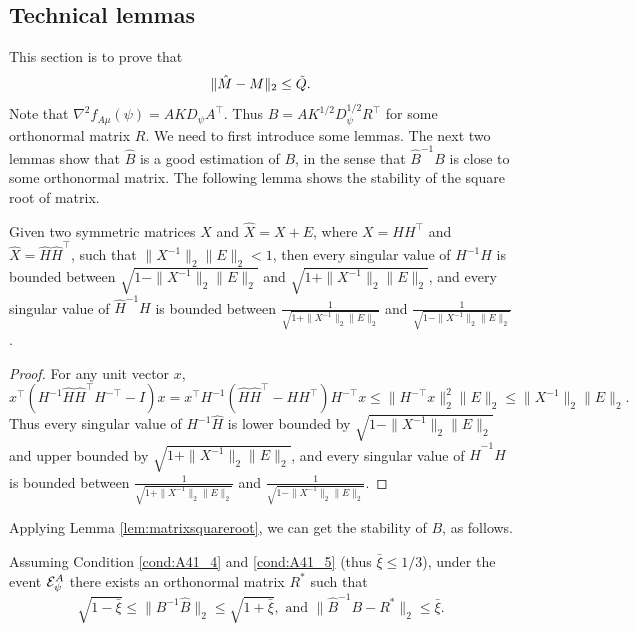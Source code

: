 \subsection{Technical lemmas}
This section is to prove that 
\[
\|\hat{M} - M\|_2 \le \tilde{Q}.
\]
Note that $\nabla^2f_{A\mu}(\psi) = AKD_{\psi}A^{\top}$. Thus $B = AK^{1/2}D_{\psi}^{1/2}R^{\top}$ for some orthonormal matrix $R$. 
We need to first introduce some lemmas. 
The next two lemmas show that $\hat{B}$ is a good estimation of $B$, 
in the sense that $\hat{B}^{-1}B$ is close to some orthonormal matrix.
The following lemma shows the stability of the square root of matrix.
\begin{lemma}
	\label{lem:matrixsquareroot}
	Given two symmetric matrices $X$ and $\hat{X} = X + E$, where $X = HH^{\top}$ and $\hat{X} = \hat{H}\hat{H}^{\top}$, such that $\|X^{-1}\|_2 \|E\|_2 < 1$, then every singular value of $H^{-1}\hat{H}$ is bounded between $\sqrt{1- \|X^{-1}\|_2 \|E\|_2}$ and $\sqrt{1+ \|X^{-1}\|_2 \|E\|_2}$, 
	and every singular value of $\hat{H}^{-1}H$ is bounded between $\frac{1}{\sqrt{1 + \|X^{-1}\|_2 \|E\|_2}}$ and $\frac{1}{\sqrt{1 - \|X^{-1}\|_2 \|E\|_2}}$. 
\end{lemma}
\begin{proof}
	For any unit vector $x$,
	$
	x^{\top}\left(H^{-1}\hat{H}\hat{H}^{\top}H^{-\top} - I\right)x
	= x^{\top}H^{-1}\left( \hat{H}\hat{H}^{\top} - HH^{\top}\right)H^{-\top}x 
	\le \|H^{-\top}x\|^2_2 \|E\|_2 \le \|X^{-1}\|_2 \|E\|_2.
	$
	Thus every singular value of $H^{-1}\hat{H}$ is lower bounded by $\sqrt{1- \|X^{-1}\|_2 \|E\|_2}$ and upper bounded by $\sqrt{1+ \|X^{-1}\|_2 \|E\|_2}$, 
	and every singular value of $\hat{H}^{-1}H$ is bounded between $\frac{1}{\sqrt{1 + \|X^{-1}\|_2 \|E\|_2}}$ and $\frac{1}{\sqrt{1 - \|X^{-1}\|_2 \|E\|_2}}$.
\end{proof}
Applying Lemma \ref{lem:matrixsquareroot}, we can get the stability of $B$, as follows.
\begin{lemma}
	\label{lem:BhatinverseB}
	Assuming Condition \eqref{cond:A41_4} and \eqref{cond:A41_5}
	(thus $\bar{\xi} \le 1/3$), under the event $\mathcal{E}^A_{\psi}$ there exists an orthonormal matrix $R^*$ such that 
	\[
	\sqrt{1-\bar{\xi}} \le \|B^{-1}\hat{B}\|_2 \le \sqrt{1+\bar{\xi}},
	\text{ and }
	\|\hat{B}^{-1}B - R^*\|_2 \le \bar{\xi}.
	\]
\end{lemma}
